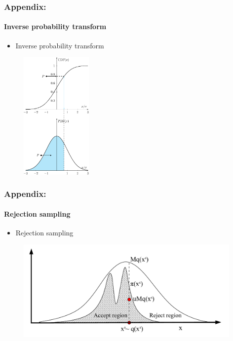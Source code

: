 
\begin{frame}
\frametitle{Appendix:}
\framesubtitle{Inverse probability transform}
\begin{itemize}
    \item Inverse probability transform
\end{itemize}
\begin{figure}[ht]
    \includegraphics[width = 35mm]{figures/figure-CDF.pdf}
\end{figure}
\end{frame}

\begin{frame}
\frametitle{Appendix:}
\framesubtitle{Rejection sampling}
\begin{itemize}
    \item Rejection sampling
\end{itemize}
\begin{figure}[ht]
    \includegraphics[width = 110mm]{figures/figure-rejectionsampling.pdf}
\end{figure}
\end{frame}

